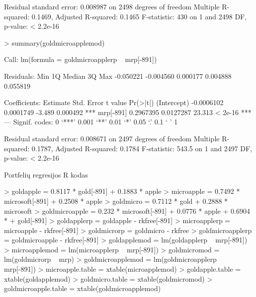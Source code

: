 \documentclass[12pt, a14paper, lithuanian]{article}
\begin{document}
\begin{Schunk}
\begin{Soutput}
Residual standard error: 0.008987 on 2498 degrees of freedom
Multiple R-squared: 0.1469,	Adjusted R-squared: 0.1465 
F-statistic:   430 on 1 and 2498 DF,  p-value: < 2.2e-16 
\end{Soutput}
\begin{Sinput}
> summary(goldmicroapplemod)
\end{Sinput}
\begin{Soutput}
Call:
lm(formula = goldmicroapplerp ~ mrp[-891])

Residuals:
      Min        1Q    Median        3Q       Max 
-0.050221 -0.004560  0.000177  0.004888  0.055819 

Coefficients:
              Estimate Std. Error t value Pr(>|t|)    
(Intercept) -0.0006102  0.0001749  -3.489 0.000492 ***
mrp[-891]    0.2967395  0.0127287  23.313  < 2e-16 ***
---
Signif. codes:  0 ‘***’ 0.001 ‘**’ 0.01 ‘*’ 0.05 ‘.’ 0.1 ‘ ’ 1 

Residual standard error: 0.008671 on 2497 degrees of freedom
Multiple R-squared: 0.1787,	Adjusted R-squared: 0.1784 
F-statistic: 543.5 on 1 and 2497 DF,  p-value: < 2.2e-16 
\end{Soutput}
\end{Schunk}

 Portfelių regresijos R kodas

\begin{Schunk}
\begin{Sinput}
> goldapple = 0.8117 * gold[-891] + 0.1883 * apple
> microapple = 0.7492 * microsoft[-891] + 0.2508 * apple
> goldmicro = 0.7112 * gold + 0.2888 * microsoft
> goldmicroapple = 0.232 * microsoft[-891] + 0.0776 * apple + 0.6904 * 
+     gold[-891]
> goldapplerp = goldapple - rkfree[-891]
> microapplerp = microapple - rkfree[-891]
> goldmicrorp = goldmicro - rkfree
> goldmicroapplerp = goldmicroapple - rkfree[-891]
> goldapplemod = lm(goldapplerp ~ mrp[-891])
> microapplemod = lm(microapplerp ~ mrp[-891])
> goldmicromod = lm(goldmicrorp ~ mrp)
> goldmicroapplemod = lm(goldmicroapplerp ~ mrp[-891])
> microapple.table = xtable(microapplemod)
> goldapple.table = xtable(goldapplemod)
> goldmicro.table = xtable(goldmicromod)
> goldmicroapple.table = xtable(goldmicroapplemod)
\end{Sinput}
\end{Schunk}
\end{document}

